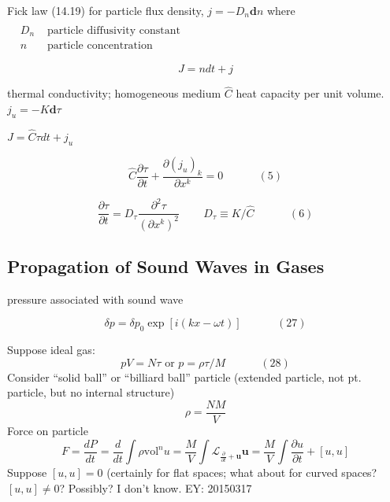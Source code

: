 Fick law (14.19) for particle flux density, $j = -D_n \mathbf{d}n$ where $\begin{aligned}  & \quad \\ 
  & D_n  & \text{ particle diffusivity constant } \\ 
  & n   & \text{ particle concentration } \end{aligned}$ 

\[
J = n dt + j
\]

thermal conductivity; homogeneous medium
$\widehat{C}$ heat capacity per unit volume.  $j_u = -K \mathbf{d}\tau$

$J = \widehat{C} \tau dt + j_u$

\begin{equation}
\widehat{C} \frac{ \partial \tau}{ \partial t} + \frac{ \partial (j_u)_k}{ \partial x^k} = 0 \quad \quad \quad \, (5)
\end{equation}

\begin{equation}
  \frac{ \partial \tau}{ \partial t} = D_{\tau} \frac{ \partial^2 \tau}{ ( \partial x^k)^2 } \quad \quad \, D_{\tau} \equiv K/\widehat{C} \quad \quad \quad \, (6) 
\end{equation}

\subsection*{Propagation of Sound Waves in Gases}

pressure associated with sound wave 

\begin{equation}
  \delta p = \delta p_0 \exp{ [ i (kx - \omega t) ] } \quad \quad \quad \, (27) 
\end{equation}

Suppose ideal gas: 
\begin{equation}
  pV = N \tau \text{ or } p = \rho \tau /M \quad \quad \quad \, (28)
\end{equation}
Consider ``solid ball'' or ``billiard ball'' particle (extended particle, not pt. particle, but no internal structure)
\[
\rho = \frac{NM}{V}
\]
Force on particle 
\[
F = \frac{dP}{dt} = \frac{d}{dt} \int \rho \text{vol}^n u = \frac{M}{V} \int \mathcal{L}_{ \frac{ \partial }{ \partial t} + \mathbf{u} }\mathbf{u} = \frac{M}{V} \int \frac{ \partial u}{ \partial t} + [u,u]
\]
Suppose $[u,u]=0$ (certainly for flat spaces; what about for curved spaces? $[u,u] \neq 0$? Possibly? I don't know. EY: 20150317

